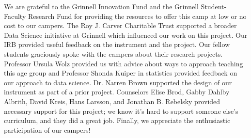 \begin{acks}
\small
We are grateful to the Grinnell Innovation Fund and the Grinnell
Student-Faculty Research Fund for providing the resources to offer
this camp at low or no cost to our campers.  The Roy J. Carver
Charitable Trust supported a broader Data Science initiative at
Grinnell which influenced our work on this project.  Our IRB provided
useful feedback on the instrument and the project.  Our fellow
students graciously spoke with the campers about their research
projects.  Professor Ursula Wolz provided us with advice about ways
to approach teaching this age group and Professor Shonda Kuiper in
statistics provided feedback on our approach to data science.  Dr.
Narren Brown supported the design of our instrument as part of a
prior project.  Counselors Elise Brod, Gabby Dahlby Albrith, David
Kreis, Hans Larsson, and Jonathan B. Rebelsky provided necessary
support for this project; we know it's hard to support someone
else's curriculum, and they did a great job.  Finally, we appreciate
the enthusiastic participation of our campers!

\end{acks}
